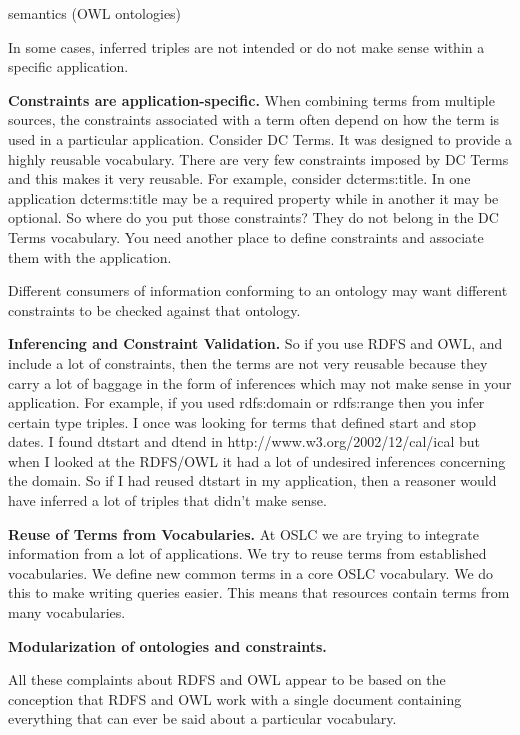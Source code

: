 \documentclass{llncs}
\begin{document}
semantics (OWL ontologies)

In some cases, inferred triples are not intended or do not make sense within a specific application.

\textbf{Constraints are application-specific.}
When combining terms from multiple sources, 
the constraints associated with a term often depend on how 
the term is used in a particular application. Consider DC Terms. It was 
designed to provide a highly reusable vocabulary. There are very few 
constraints imposed by DC Terms and this makes it very reusable. For 
example, consider dcterms:title. In one application dcterms:title may be a 
required property while in another it may be optional. So where do you put 
those constraints? They do not belong in the DC Terms vocabulary. You need 
another place to define constraints and associate them with the 
application. 

Different consumers of information conforming to an ontology may want
different constraints to be checked against that ontology.  

\textbf{Inferencing and Constraint Validation.}
So if you use RDFS and OWL, and include a lot of constraints, then the 
terms are not very reusable because they carry a lot of baggage in the 
form of inferences which may not make sense in your application. For 
example, if you used rdfs:domain or rdfs:range then you infer certain type 
triples. I once was looking for terms that defined start and stop dates. I 
found dtstart and dtend in http://www.w3.org/2002/12/cal/ical but when I 
looked at the RDFS/OWL it had a lot of undesired inferences concerning the 
domain. So if I had reused dtstart in my application, then a reasoner 
would have inferred a lot of triples that didn't make sense.

\textbf{Reuse of Terms from Vocabularies.}
At OSLC we are trying to integrate information from a lot of applications. 
We try to reuse terms from established vocabularies. We define new common 
terms in a core OSLC vocabulary. We do this to make writing queries 
easier. This means that resources contain terms from many vocabularies.


\textbf{Modularization of ontologies and constraints.}

All these complaints about RDFS and OWL appear to be based on the conception 
that RDFS and OWL work with a single document containing everything that can 
ever be said about a particular vocabulary.
\end{document}
